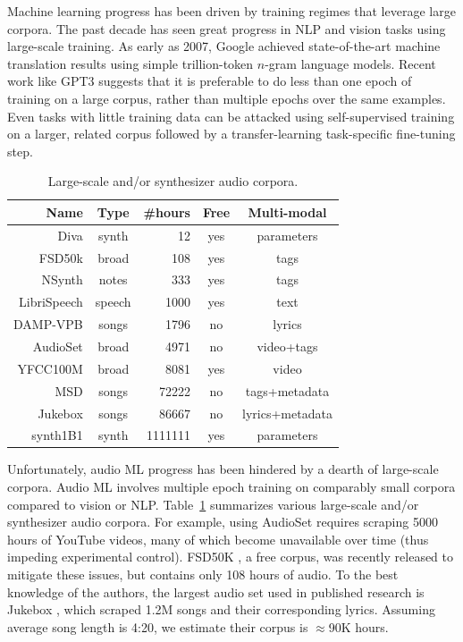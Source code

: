 Machine learning progress has been driven by training regimes that leverage large corpora. The past decade has seen great progress in NLP and vision tasks using large-scale training. As early as 2007, Google \cite{brants-etal-2007-large} achieved state-of-the-art machine translation results using simple trillion-token $n$-gram language models.
Recent work like GPT3 \cite{NEURIPS2020_1457c0d6} suggests that it is preferable to do less than one epoch of training on a large corpus, rather than multiple epochs over the same examples. Even tasks with little training data can be attacked using self-supervised training on a larger, related corpus followed by a transfer-learning task-specific fine-tuning step.

\begin{table}[thb]
\begin{center}
\begin{tabular}{r|c|r|c|c}
Name & Type & \#hours & Free & Multi-modal \\
\hline
Diva \cite{esling2020flow} & synth & 12 & yes & parameters \\
FSD50k \cite{fonseca2020fsd50k} & broad & 108 & yes & tags \\
NSynth \cite{engel2017neural} & notes & 333 & yes & tags \\
LibriSpeech \cite{librispeech} & speech & 1000 & yes & text \\ 
DAMP-VPB \cite{smule_inc_2017_2616690} & songs & 1796 & no & lyrics \\
AudioSet \cite{45857} & broad & 4971 & no & video+tags \\ 
YFCC100M \cite{thomee2016yfcc100m} & broad & 8081 & yes & video \\
MSD \cite{bertin2011million} & songs & 72222 & no & tags+metadata \\
Jukebox \cite{dhariwal2020jukebox} & songs & 86667 & no & {\footnotesize lyrics+metadata}\\
synth1B1 & synth & 1111111 & yes & parameters \\
\end{tabular}
\end{center}
\caption{Large-scale and/or synthesizer audio corpora.}
\label{tbl:audio-corpora}
\end{table}

Unfortunately, audio ML progress has been hindered by a dearth of large-scale corpora. Audio ML involves multiple epoch training on comparably small corpora compared to vision or NLP. Table~\ref{tbl:audio-corpora} summarizes various large-scale and/or synthesizer audio corpora.
For example, using AudioSet \cite{45857} requires scraping 5000 hours of YouTube videos, many of which become unavailable over time (thus impeding experimental control). FSD50K \cite{fonseca2020fsd50k}, a free corpus, was recently released to mitigate these issues, but contains only 108 hours of audio. To the best knowledge of the authors, the largest audio set used in published research is Jukebox \cite{dhariwal2020jukebox}, which scraped 1.2M songs and their corresponding lyrics. Assuming average song length is 4:20, we estimate their corpus is $\approx$90K hours. 

